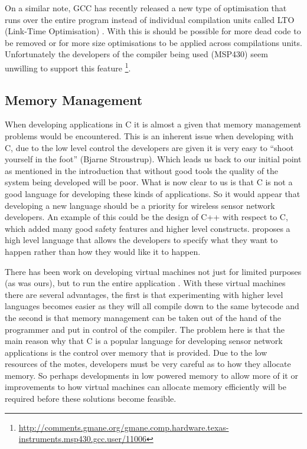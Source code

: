 On a similar note, GCC has recently released a new type of optimisation that runs over the entire program instead of individual compilation units called LTO (Link-Time Optimisation) \cite{WHOPR}. With this is should be possible for more dead code to be removed or for more size optimisations to be applied across compilations units. Unfortunately the developers of the compiler being used (MSP430) seem unwilling to support this feature \footnote{\url{http://comments.gmane.org/gmane.comp.hardware.texas-instruments.msp430.gcc.user/11006}}.

\subsection{Memory Management}

When developing applications in C it is almost a given that memory management problems would be encountered. This is an inherent issue when developing with C, due to the low level control the developers are given it is very easy to ``shoot yourself in the foot'' (Bjarne Stroustrup). Which leads us back to our initial point as mentioned in the introduction that without good tools the quality of the system being developed will be poor. What is now clear to us is that C is not a good language for developing these kinds of applications. So it would appear that developing a new language should be a priority for wireless sensor network developers. An example of this could be the design of C++ with respect to C, which added many good safety features and higher level constructs. \cite{1281625} proposes a high level language that allows the developers to specify what they want to happen rather than how they would like it to happen.

There has been work on developing virtual machines not just for limited purposes (as was ours), but to run the entire application \cite{Levis:2002:MTV:635508.605407,Muller:2007:VMS:1272998.1273013}. With these virtual machines there are several advantages, the first is that experimenting with higher level languages becomes easier as they will all compile down to the same bytecode and the second is that memory management can be taken out of the hand of the programmer and put in control of the compiler. The problem here is that the main reason why that C is a popular language for developing sensor network applications is the control over memory that is provided. Due to the low resources of the motes, developers must be very careful as to how they allocate memory. So perhaps developments in low powered memory to allow more of it or improvements to how virtual machines can allocate memory efficiently will be required before these solutions become feasible.

